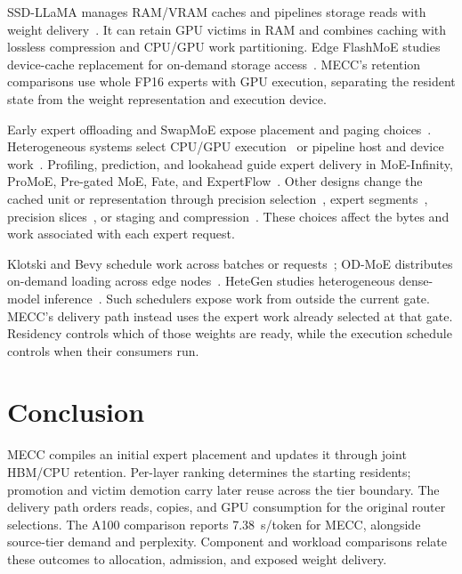 \documentclass[conference,9pt,letterpaper]{IEEEtran}
\begin{document}
SSD-LLaMA manages RAM/VRAM caches and pipelines storage reads with weight delivery~\cite{ssdllama}. It can retain GPU victims in RAM and combines caching with lossless compression and CPU/GPU work partitioning. Edge FlashMoE studies device-cache replacement for on-demand storage access~\cite{flashmoe}. MECC's retention comparisons use whole FP16 experts with GPU execution, separating the resident state from the weight representation and execution device.

Early expert offloading and SwapMoE expose placement and paging choices~\cite{offloading,swapmoe}. Heterogeneous systems select CPU/GPU execution~\cite{fiddler,daop} or pipeline host and device work~\cite{lightning}. Profiling, prediction, and lookahead guide expert delivery in MoE-Infinity, ProMoE, Pre-gated MoE, Fate, and ExpertFlow~\cite{moeinfinity,promoe,pregated,fate,expertflow}. Other designs change the cached unit or representation through precision selection~\cite{hobbit,specter}, expert segments~\cite{moepic}, precision slices~\cite{slicemoe}, or staging and compression~\cite{mira,zipmoe}. These choices affect the bytes and work associated with each expert request.

Klotski and Bevy schedule work across batches or requests~\cite{klotski,bevy}; OD-MoE distributes on-demand loading across edge nodes~\cite{odmoe}. HeteGen studies heterogeneous dense-model inference~\cite{hetegen}. Such schedulers expose work from outside the current gate. MECC's delivery path instead uses the expert work already selected at that gate. Residency controls which of those weights are ready, while the execution schedule controls when their consumers run.

\section{Conclusion}
MECC compiles an initial expert placement and updates it through joint HBM/CPU retention. Per-layer ranking determines the starting residents; promotion and victim demotion carry later reuse across the tier boundary. The delivery path orders reads, copies, and GPU consumption for the original router selections. The A100 comparison reports 7.38~s/token for MECC, alongside source-tier demand and perplexity. Component and workload comparisons relate these outcomes to allocation, admission, and exposed weight delivery.

\clearpage
\nobalance
{}


\clearpage
\appendices
\balance
\end{document}
